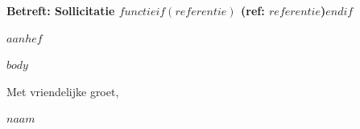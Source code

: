 \documentclass[a4paper, 11pt]{article}
\begin{document}
\vspace{0.45cm}

\textbf{Betreft: Sollicitatie $functie$$if(referentie)$ \textnormal{(ref: $referentie$)}$endif$}

\vspace{0.45cm}

$aanhef$

\vspace{0.15em}

$body$

\vspace{0.4cm}

\noindent Met vriendelijke groet,

\vspace{1.2cm}

\noindent\textbf{$naam$}
\end{document}
